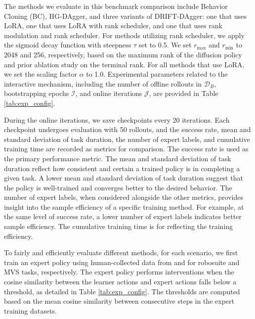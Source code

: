 The methods we evaluate in this benchmark comparison include Behavior Cloning (BC), HG-DAgger, and three variants of DRIFT-DAgger: one that uses LoRA, one that uses LoRA with rank scheduler, and one that uses rank modulation and rank scheduler. 
For methods utilizing rank scheduler, we apply the sigmoid decay function with steepness $\tau$ set to 0.5. We set $r_{\text{max}}$ and $r_{\text{min}}$ to 2048 and 256, respectively, based on the maximum rank of the diffusion policy and prior ablation study on the terminal rank. For all methods that use LoRA, we set the scaling factor $\alpha$ to 1.0. 
Experimental parameters related to the interactive mechanism, including the number of offline rollouts in $\mathcal{D}_B$, bootstrapping epochs $\mathcal{I}$, and online iterations $\mathcal{J}$, are provided in Table \ref{tab:exp_config}. 

During the online iterations, we save checkpoints every 20 iterations. Each checkpoint undergoes evaluation with 50 rollouts, and the success rate, mean and standard deviation of task duration, the number of expert labels, and cumulative training time are recorded as metrics for comparison. 
The success rate is used as the primary performance metric. The mean and standard deviation of task duration reflect how consistent and certain a trained policy is in completing a given task. A lower mean and standard deviation of task duration suggest that the policy is well-trained and converges better to the desired behavior. The number of expert labels, when considered alongside the other metrics, provides insight into the sample efficiency of a specific training method. For example, at the same level of success rate, a lower number of expert labels indicates better sample efficiency. The cumulative training time is for reflecting the training efficiency.

To fairly and efficiently evaluate different methods, for each scenario, we first train an expert policy using human-collected data from \citet{robomimic2021} and \citet{sun2024comparative} for robosuite and MVS tasks, respectively. The expert policy performs interventions when the cosine similarity between the learner actions and expert actions falls below a threshold, as detailed in Table \ref{tab:exp_config}. The thresholds are computed based on the mean cosine similarity between consecutive steps in the expert training datasets.

